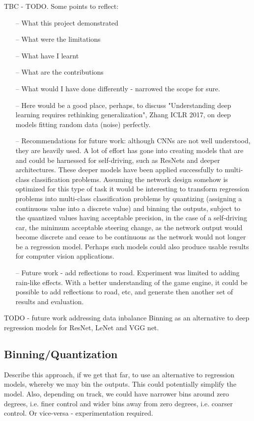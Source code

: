 TBC - TODO. Some points to reflect:
\begin{itemize}
    \item[--] What this project demonstrated
    \item[--] What were the limitations
    \item[--] What have I learnt
    \item[--] What are the contributions
    \item[--] What would I have done differently - narrowed the scope for sure.
    \item[--] Here would be a good place, perhaps, to discuss "Understanding deep learning requires rethinking generalization", Zhang ICLR 2017, on deep models fitting random data (noise) perfectly. 
    \item[--] Recommendations for future work: although CNNs are not well understood, they are heavily used. A lot of effort has gone into creating models that are and could be harnessed for self-driving, such as ResNets and deeper architectures. These deeper models have been applied successfully to multi-class classification problems. Assuming the network design somehow is optimized for this type of task it would be interesting to transform regression problems into multi-class classification problems by quantizing (assigning a continuous value into a discrete value) and binning the outputs, subject to the quantized values having acceptable precision, in the case of a self-driving car, the minimum acceptable steering change, as the network output would become discrete and cease to be continuous as the network would not longer be a regression model.
    Perhaps such models could also produce usable results for computer vision applications.
    \item[--] Future work - add reflections to road. Experiment was limited to adding rain-like effects. With a better understanding of the game engine, it could be possible to add reflections to road, etc, and generate then another set of results and evaluation.
\end{itemize}
TODO - future work
addressing data inbalance
Binning as an alternative to deep regression models for ResNet, LeNet and VGG net. 
\subsection{Binning/Quantization}
Describe this approach, if we get that far, to use an alternative to regression models, whereby we may bin the outputs. This could potentially simplify the model. Also, depending on track, we could have narrower bins around zero degrees, i.e. finer control and wider bins away from zero degrees, i.e. coarser control. Or vice-versa - experimentation required.
